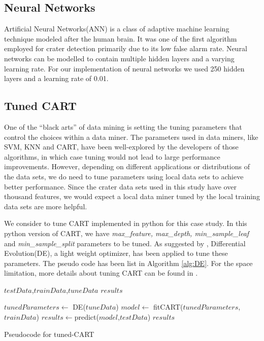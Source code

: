 \documentclass[conference]{IEEEtran}
\begin{document}
\subsection{Neural Networks}
Artificial Neural Networks(ANN) is a class of adaptive machine learning technique modeled after the human brain. It was one of the first algorithm employed for crater detection \cite{ding2011subkilometer} primarily due to its low false alarm rate. Neural networks can be modelled to contain multiple hidden layers and a varying learning rate. For our implementation of neural networks we used 250 hidden layers and a learning rate of 0.01. 

\subsection{Tuned CART}
One of the “black arts” of data mining is setting the tuning
parameters that control the choices within a data miner. The 
parameters used in data miners, like SVM, 
KNN and CART, have been well-explored by
the developers of those algorithms, in which case tuning
would not lead to large performance improvements. However, 
depending on different applications or distributions of the 
data sets, we do need to tune parameters using local data
sets to achieve better performance\cite{Wei2015ase}. 
Since the crater data sets used in this study have over thousand features,
we would expect a local data miner tuned by the local training data sets
are more helpful.

We consider to tune CART implemented in python\cite{scikit-learn} for 
this case study. In this python version of CART, we have {\it max\_feature, max\_depth,
min\_sample\_leaf} and {\it min\_sample\_split} parameters to be tuned.
As suggested by \cite{Wei2015ase}, Differential Evolution(DE), a light weight optimizer,
has been applied to tune these parameters. The pseudo code has been list in Algorithm \ref{alg:DE}.
For the space limitation, more details about tuning CART can be found in \cite{Wei2015ase}.
  
\setcounter{algorithm}{3}
\begin{algorithm}[!t]

\scriptsize

\begin{algorithmic}[1]
\Require $testData$,$trainData$,$tuneData$
\Ensure $results$


 \State $tunedParameters  \gets $ DE($tuneData$) 
 \State $model \gets $ fitCART($tunedParameters$,$trainData$)
 \State $results \gets $predict($model$,$testData$)
  \State \Return $results$
\EndFunction
        \end{algorithmic} 
\caption{Pseudocode for tuned-CART}
\label{alg:DE}
\end{algorithm}
\end{document}
